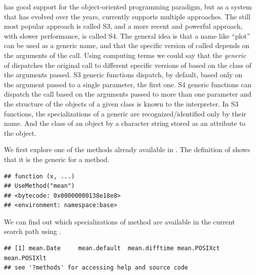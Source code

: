 \documentclass[krantz2]{krantz}\usepackage{knitr}
\begin{document}
\Rlang has good support for the object-oriented programming paradigm, but as a system that has evolved over the years, currently \Rlang supports multiple approaches. The still most popular approach is called S3, and a more recent and powerful approach, with slower performance, is called S4. The general idea is that a name like ``plot'' can be used as a generic name, and that the specific version of  called depends on the arguments of the call. Using computing terms we could say that the \emph{generic} of  dispatches the original call to different specific versions of  based on the class of the arguments passed. S3 generic functions dispatch, by default, based only on the argument passed to a single parameter, the first one. S4 generic functions can dispatch the call based on the arguments passed to more than one parameter and the structure of the objects of a given class is known to the interpreter. In S3 functions, the specializations of a generic are recognized/identified only by their name. And the class of an object by a character string stored as an attribute to the object.

We first explore one of the methods already available in \Rlang. The definition of  shows that it is the generic for a method.

\begin{knitrout}\footnotesize
{}\color{fgcolor}\begin{kframe}
\begin{alltt}
\end{alltt}
\begin{verbatim}
## function (x, ...)
## UseMethod("mean")
## <bytecode: 0x00000000138e18e8>
## <environment: namespace:base>
\end{verbatim}
\end{kframe}
\end{knitrout}

We can find out which specializations of method are available in the current search path using .

\begin{knitrout}\footnotesize
{}\color{fgcolor}\begin{kframe}
\begin{alltt}
\end{alltt}
\begin{verbatim}
## [1] mean.Date     mean.default  mean.difftime mean.POSIXct  mean.POSIXlt
## see '?methods' for accessing help and source code
\end{verbatim}
\end{kframe}
\end{knitrout}
\end{document}
